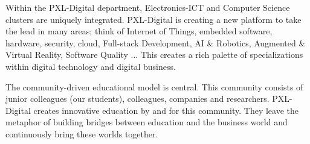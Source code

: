 Within the PXL-Digital department, Electronics-ICT and Computer Science clusters are uniquely integrated. 
PXL-Digital is creating a new platform to take the lead in many areas; think of Internet of Things, embedded software,
 hardware, security, cloud, Full-stack Development, AI \& Robotics, Augmented \& Virtual Reality, Software Quality 
 ... This creates a rich palette of specializations within digital technology and digital business.

The community-driven educational model is central. This community consists of junior colleagues (our students), 
colleagues, companies and researchers. PXL-Digital creates innovative education by and for this community. They leave the 
metaphor of building bridges between education and the business world and continuously bring these worlds together. 

